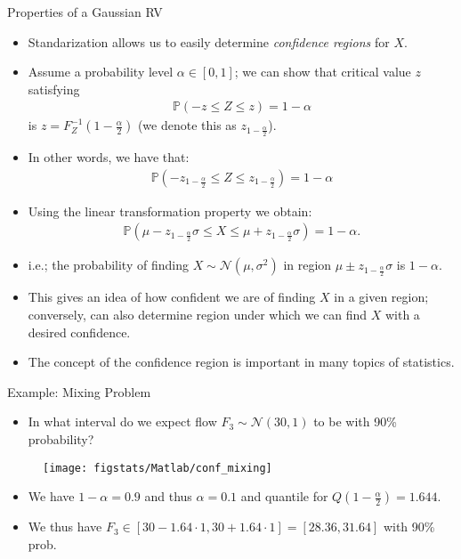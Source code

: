 \documentclass[9pt]{beamer}
\begin{document}
%
\begin{frame}{Properties of a Gaussian RV}

\begin{itemize}
\item Standarization allows us to easily determine {\em confidence regions} for $X$.

\item Assume a probability level $\alpha \in [0,1]$; we can show that critical value $z$ satisfying
\begin{align*}
\mathbb{P}(-z\leq Z\leq z)=1-\alpha
\end{align*}
is $z=F_Z^{-1}(1-\frac{\alpha}{2})$ (we denote this as $z_{1-\frac{\alpha}{2}}$). 
\item In other words, we have that:
\begin{align*}
\mathbb{P}(-z_{1-\frac{\alpha}{2}}\leq Z\leq z_{1-\frac{\alpha}{2}})=1-\alpha
\end{align*} 
\item Using the linear transformation property we obtain:
\begin{align*}
\mathbb{P}(\mu-z_{1-\frac{\alpha}{2}}\sigma\leq X\leq \mu+z_{1-\frac{\alpha}{2}}\sigma)=1-\alpha.
\end{align*}
\item i.e.; the probability of finding $X\sim\mathcal{N}(\mu,\sigma^2)$ in region $\mu\pm z_{1-\frac{\alpha}{2}}\sigma$ is $1-\alpha$. 
\item This gives an idea of how confident we are of finding $X$ in a given region; conversely, can also determine region under which we can find $X$ with a desired confidence. 
\item The concept of the confidence region is important in many topics of statistics. 
\end{itemize}
\end{frame}

\begin{frame}{Example: Mixing Problem}
\begin{itemize}
\item In what interval do we expect flow $F_3\sim\mathcal{N}(30,1)$ to be with 90\% probability? 
\end{itemize}
\begin{figure}[!htb]
    \centering
	\texttt{[image: figstats/Matlab/conf\_mixing]}
\end{figure}
\begin{itemize}
\item We have $1-\alpha=0.9$ and thus $\alpha=0.1$ and quantile for $Q(1-\frac{\alpha}{2})=1.644$.
\item We thus have $F_3\in [30-1.64\cdot 1,30+1.64\cdot 1]=[28.36,31.64]$ with 90\% prob. 
\end{itemize}
\end{frame}
\end{document}
